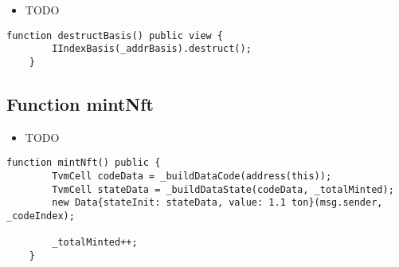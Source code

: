 \begin{itemize}
\item TODO
\end{itemize}

\begin{lstlisting}[firstnumber=47]
    function destructBasis() public view {
        IIndexBasis(_addrBasis).destruct();
    }
\end{lstlisting}

\subsection{Function mintNft}

\begin{itemize}
\item TODO
\end{itemize}

\begin{lstlisting}[firstnumber=25]
    function mintNft() public {
        TvmCell codeData = _buildDataCode(address(this));
        TvmCell stateData = _buildDataState(codeData, _totalMinted);
        new Data{stateInit: stateData, value: 1.1 ton}(msg.sender, _codeIndex);

        _totalMinted++;
    }
\end{lstlisting}
